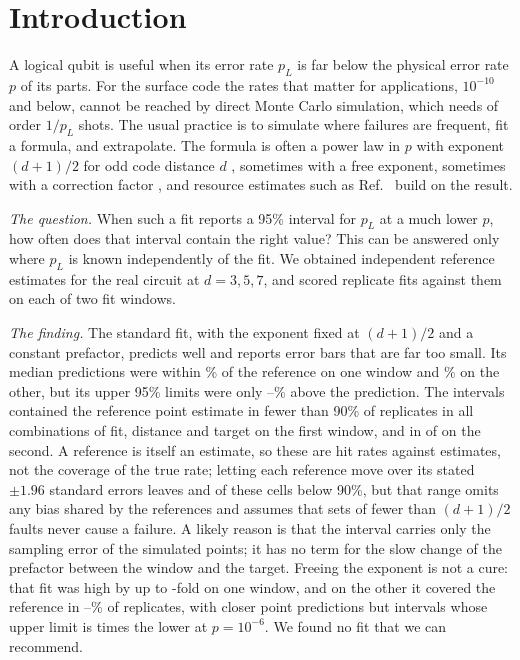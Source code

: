 \documentclass[aps,pre,twocolumn,superscriptaddress,nofootinbib,10pt]{revtex4-2}
\newcommand{\pL}{p_L}
\begin{document}
\maketitle

\section{Introduction}
A logical qubit is useful when its error rate $\pL$ is far below the physical error rate $p$ of its parts. For the surface code \cite{dennis2002,fowler2012} the rates that matter for applications, $10^{-10}$ and below, cannot be reached by direct Monte Carlo simulation, which needs of order $1/\pL$ shots. The usual practice is to simulate where failures are frequent, fit a formula, and extrapolate. The formula is often a power law in $p$ with exponent $(d+1)/2$ for odd code distance $d$ \cite{fowler2012,litinski2019}, sometimes with a free exponent, sometimes with a correction factor \cite{bravyi2024}, and resource estimates such as Ref.~\cite{gidneyekera2021} build on the result.

\emph{The question.} When such a fit reports a 95\% interval for $\pL$ at a much lower $p$, how often does that interval contain the right value? This can be answered only where $\pL$ is known independently of the fit. We obtained independent reference estimates for the real circuit at $d=3,5,7$, and scored  replicate fits against them on each of two fit windows.

\emph{The finding.} The standard fit, with the exponent fixed at $(d+1)/2$ and a constant prefactor, predicts well and reports error bars that are far too small. Its median predictions were within \% of the reference on one window and \% on the other, but its upper 95\% limits were only --\% above the prediction. The intervals contained the reference point estimate in fewer than 90\% of replicates in all  combinations of fit, distance and target on the first window, and in  of  on the second. A reference is itself an estimate, so these are hit rates against estimates, not the coverage of the true rate; letting each reference move over its stated $\pm1.96$ standard errors leaves  and  of these cells below 90\%, but that range omits any bias shared by the references and assumes that sets of fewer than $(d+1)/2$ faults never cause a failure. A likely reason is that the interval carries only the sampling error of the simulated points; it has no term for the slow change of the prefactor between the window and the target. Freeing the exponent is not a cure: that fit was high by up to -fold on one window, and on the other it covered the reference in --\% of replicates, with closer point predictions but intervals whose upper limit is  times the lower at $p=10^{-6}$. We found no fit that we can recommend.
\end{document}
